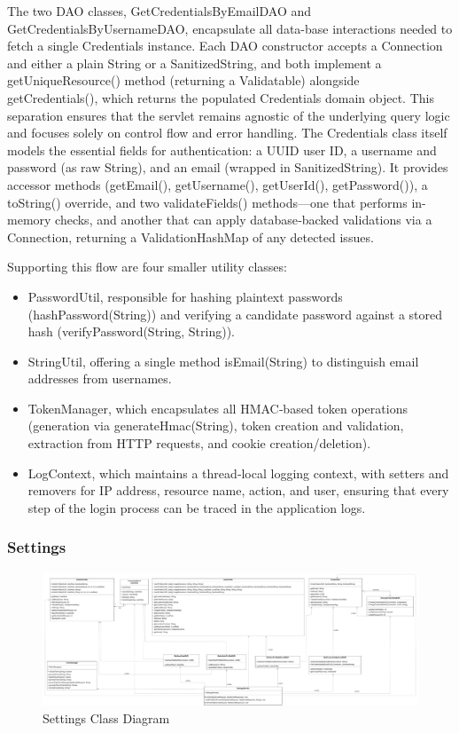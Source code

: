 The two DAO classes, GetCredentialsByEmailDAO and GetCredentialsByUsernameDAO, encapsulate all data-base interactions needed to fetch a single Credentials instance. Each DAO constructor accepts a Connection and either a plain String or a SanitizedString, and both implement a getUniqueResource() method (returning a Validatable) alongside getCredentials(), which returns the populated Credentials domain object. This separation ensures that the servlet remains agnostic of the underlying query logic and focuses solely on control flow and error handling.
The Credentials class itself models the essential fields for authentication: a UUID user ID, a username and password (as raw String), and an email (wrapped in SanitizedString). It provides accessor methods (getEmail(), getUsername(), getUserId(), getPassword()), a toString() override, and two validateFields() methods—one that performs in-memory checks, and another that can apply database‐backed validations via a Connection, returning a ValidationHashMap of any detected issues.

Supporting this flow are four smaller utility classes:
\begin{itemize}
    \item PasswordUtil, responsible for hashing plaintext passwords (hashPassword(String)) and verifying a candidate password against a stored hash (verifyPassword(String, String)).
    \item StringUtil, offering a single method isEmail(String) to distinguish email addresses from usernames.
    \item TokenManager, which encapsulates all HMAC‐based token operations (generation via generateHmac(String), token creation and validation, extraction from HTTP requests, and cookie creation/deletion).
    \item LogContext, which maintains a thread‐local logging context, with setters and removers for IP address, resource name, action, and user, ensuring that every step of the login process can be traced in the application logs.
\end{itemize}

\subsubsection{Settings}
\begin{figure}[H]
    \centering
    \includegraphics[width=\textwidth]{images/class_diagrams/Settings_classdiagram.pdf}
    \caption{Settings Class Diagram}
\end{figure}

